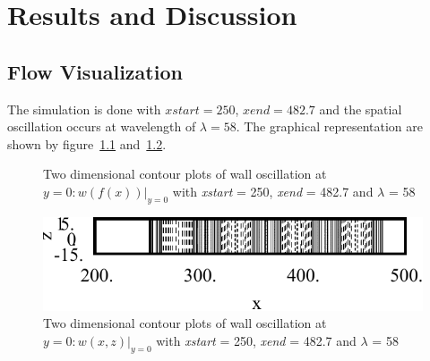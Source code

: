 \chapter{Results and Discussion}
\section{Flow Visualization}
The simulation is done with $xstart = 250$, $xend = 482.7$ and the spatial oscillation occurs at wavelength of $\lambda = 58$. The graphical representation are shown by figure~\ref{fig:w(f(x))} and~\ref{fig:w(x,z)}. 
\begin{figure}[h]
  \centering
  \caption{Two dimensional contour plots of wall oscillation at $y=0:w(f(x))|_{y=0}$ with \emph{xstart} = 250, \emph{xend} = 482.7 and $\lambda$ = 58}
  \label{fig:w(f(x))}
\end{figure}

\begin{figure}[h]
  \centering
  \includegraphics[width=15cm]{figures/w_4.pdf}
  \caption{Two dimensional contour plots of wall oscillation at $y=0:w(x,z)|_{y=0}$ with \emph{xstart} = 250, \emph{xend} = 482.7 and $\lambda$ = 58}
  \label{fig:w(x,z)}
\end{figure}

